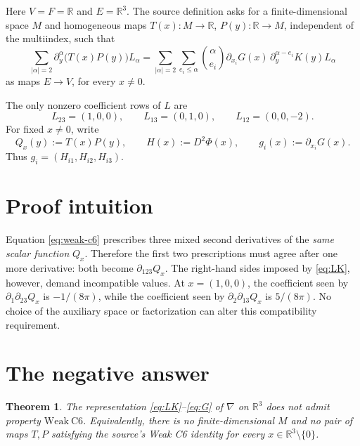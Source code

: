 \documentclass[11pt]{article}
\newcommand{\R}{\mathbb R}
\newcommand{\p}{\partial}
\newcommand{\WTP}{\mathrm{Weak\ C6}}
\newtheorem{theorem}{Theorem}
\begin{document}
Here \(V=F=\R\) and \(E=\R^3\).  The source definition asks for a
finite-dimensional space \(M\) and homogeneous maps
\(T(x):M\to\R\), \(P(y):\R\to M\), independent of the multiindex, such
that
\begin{equation}\label{eq:weak-c6}
\sum_{|\alpha|=2}\p_y^\alpha\bigl(T(x)P(y)\bigr)L_\alpha
=\sum_{|\alpha|=2}\sum_{e_i\leq\alpha}
\binom{\alpha}{e_i}\p_{x_i}G(x)\,
\p_y^{\alpha-e_i}K(y)L_\alpha
\end{equation}
as maps \(E\to V\), for every \(x\ne0\).

The only nonzero coefficient rows of \(L\) are
\begin{equation}\label{eq:Lrows}
L_{23}=(1,0,0),\qquad L_{13}=(0,1,0),\qquad
L_{12}=(0,0,-2).
\end{equation}
For fixed \(x\ne0\), write
\[
Q_x(y):=T(x)P(y),\qquad
H(x):=D^2\Phi(x),\qquad g_i(x):=\p_{x_i}G(x).
\]
Thus \(g_i=(H_{i1},H_{i2},H_{i3})\).

\section{Proof intuition}

Equation \eqref{eq:weak-c6} prescribes three mixed second derivatives of the
\emph{same scalar function} \(Q_x\).  Therefore the first two prescriptions
must agree after one more derivative: both become \(\p_{123}Q_x\).  The
right-hand sides imposed by \eqref{eq:LK}, however, demand incompatible values.
At \(x=(1,0,0)\), the coefficient seen by \(\p_1\p_{23}Q_x\) is
\(-1/(8\pi)\), while the coefficient seen by \(\p_2\p_{13}Q_x\) is
\(5/(8\pi)\).  No choice of the auxiliary space or factorization can alter
this compatibility requirement.

\section{The negative answer}

\begin{theorem}\label{thm:main}
The representation \eqref{eq:LK}--\eqref{eq:G} of \(\nabla\) on \(\R^3\)
does not admit property \(\WTP\).  Equivalently, there is no
finite-dimensional \(M\) and no pair of maps \(T,P\) satisfying the source's
Weak C6 identity for every \(x\in\R^3\setminus\{0\}\).
\end{theorem}
\end{document}
